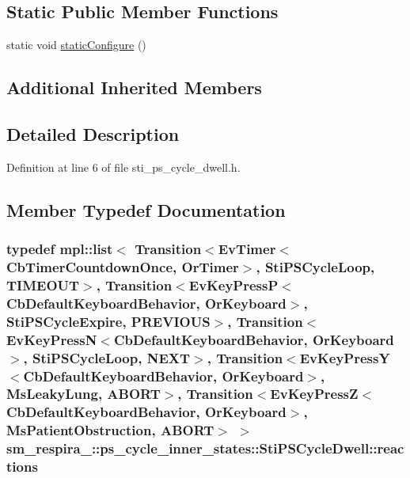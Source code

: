 \subsection*{Static Public Member Functions}
\begin{DoxyCompactItemize}
\item 
static void \hyperlink{structsm__respira__1_1_1ps__cycle__inner__states_1_1StiPSCycleDwell_af642d65faee889b5bf5b2ad6bd48fedc}{static\+Configure} ()
\end{DoxyCompactItemize}
\subsection*{Additional Inherited Members}


\subsection{Detailed Description}


Definition at line 6 of file sti\+\_\+ps\+\_\+cycle\+\_\+dwell.\+h.



\subsection{Member Typedef Documentation}
\subsubsection[{\texorpdfstring{reactions}{reactions}}]{\setlength{\rightskip}{0pt plus 5cm}typedef mpl\+::list$<$ Transition$<$Ev\+Timer$<$Cb\+Timer\+Countdown\+Once, {\bf Or\+Timer}$>$, {\bf Sti\+P\+S\+Cycle\+Loop}, {\bf T\+I\+M\+E\+O\+UT}$>$, Transition$<$Ev\+Key\+PressP$<$Cb\+Default\+Keyboard\+Behavior, {\bf Or\+Keyboard}$>$, {\bf Sti\+P\+S\+Cycle\+Expire}, {\bf P\+R\+E\+V\+I\+O\+US}$>$, Transition$<$Ev\+Key\+PressN$<$Cb\+Default\+Keyboard\+Behavior, {\bf Or\+Keyboard}$>$, {\bf Sti\+P\+S\+Cycle\+Loop}, {\bf N\+E\+XT}$>$, Transition$<$Ev\+Key\+PressY$<$Cb\+Default\+Keyboard\+Behavior, {\bf Or\+Keyboard}$>$, {\bf Ms\+Leaky\+Lung}, {\bf A\+B\+O\+RT}$>$, Transition$<$Ev\+Key\+PressZ$<$Cb\+Default\+Keyboard\+Behavior, {\bf Or\+Keyboard}$>$, {\bf Ms\+Patient\+Obstruction}, {\bf A\+B\+O\+RT}$>$ $>$ {\bf sm\+\_\+respira\+\_\+::ps\+\_\+cycle\+\_\+inner\+\_\+states\+::\+Sti\+P\+S\+Cycle\+Dwell\+::reactions}}\hypertarget{structsm__respira__1_1_1ps__cycle__inner__states_1_1StiPSCycleDwell_a71868ecd28a6aa6501a318a72207c2b5}{}\label{structsm__respira__1_1_1ps__cycle__inner__states_1_1StiPSCycleDwell_a71868ecd28a6aa6501a318a72207c2b5}


